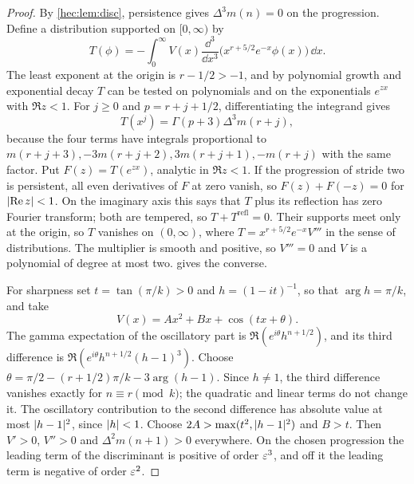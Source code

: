 \begin{proof}
By \cref{hec:lem:disc}, persistence gives $\Delta^3m(n)=0$ on the progression. Define a distribution
supported on $[0,\infty)$ by
\[
 T(\phi)=-\int_0^\infty V(x)\frac{\dd^3}{\dd x^3}\bigl(x^{r+5/2}e^{-x}\phi(x)\bigr)\,\dd x .
\]
The least exponent at the origin is $r-1/2>-1$, and by polynomial growth and exponential decay $T$ can be
tested on polynomials and on the exponentials $e^{zx}$ with $\Re z<1$. For $j\ge0$ and $p=r+j+1/2$,
differentiating the integrand gives
\[
 T(x^j)=\Gamma(p+3)\Delta^3m(r+j),
\]
because the four terms have integrals proportional to $m(r+j+3),-3m(r+j+2),3m(r+j+1),-m(r+j)$ with the same
factor. Put $F(z)=T(e^{zx})$, analytic in $\Re z<1$. If the progression of stride two is persistent, all
even derivatives of $F$ at zero vanish, so $F(z)+F(-z)=0$ for $\lvert\operatorname{Re} z\rvert<1$. On the imaginary axis this
says that $T$ plus its reflection has zero Fourier transform; both are tempered, so
$T+T^{\mathrm{refl}}=0$. Their supports meet only at the origin, so $T$ vanishes on $(0,\infty)$, where
$T=x^{r+5/2}e^{-x}V'''$ in the sense of distributions. The multiplier is smooth and positive, so $V'''=0$
and $V$ is a polynomial of degree at most two.  gives the converse.

For sharpness set $t=\tan(\pi/k)>0$ and $h=(1-it)^{-1}$, so that $\arg h=\pi/k$, and take
\[
 V(x)=Ax^2+Bx+\cos(tx+\theta).
\]
The gamma expectation of the oscillatory part is $\Re(e^{i\theta}h^{n+1/2})$, and its third difference is
$\Re(e^{i\theta}h^{n+1/2}(h-1)^3)$. Choose $\theta=\pi/2-(r+1/2)\pi/k-3\arg(h-1)$. Since $h\ne1$, the third
difference vanishes exactly for $n\equiv r\pmod k$; the quadratic and linear terms do not change it. The
oscillatory contribution to the second difference has absolute value at most $\lvert h-1\rvert^2$, since
$\lvert h\rvert<1$. Choose $2A>\max(t^2,\lvert h-1\rvert^2)$ and $B>t$. Then $V'>0$, $V''>0$ and $\Delta^2m(n+1)>0$
everywhere. On the chosen progression the leading term of the discriminant is positive of order $\varepsilon^3$,
and off it the leading term is negative of order $\varepsilon^2$.
\end{proof}

